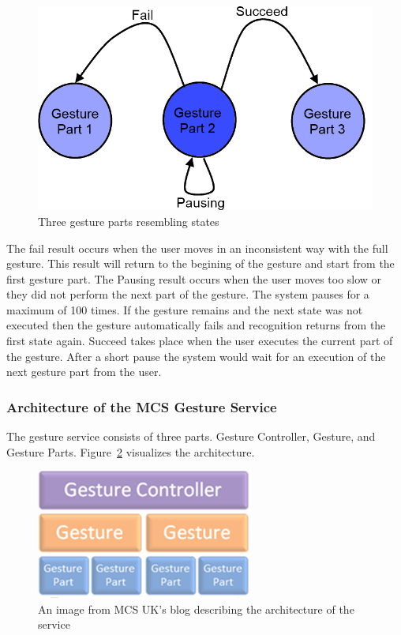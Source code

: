 \begin{figure}[!htbp]
\centering
\includegraphics[width=1\textwidth]{images/gesturestate.png}
\caption{Three gesture parts resembling states}
\label{gesturestates}
\end{figure}

The fail result occurs when the user moves in an inconsistent way with the full gesture. This result will return to the begining of the gesture and start from the first gesture part. The Pausing result occurs when the user moves too slow or they did not perform the next part of the gesture. The system pauses for a maximum of 100 times. If the gesture remains and the next state was not executed then the gesture automatically fails and recognition returns from the first state again. Succeed takes place when the user executes the current part of the gesture. After a short pause the system would wait for an execution of the next gesture part from the user.

\subsubsection{Architecture of the MCS Gesture Service}
The gesture service consists of three parts. Gesture Controller, Gesture, and Gesture Parts. Figure~\ref{gestureservicearc} visualizes the architecture.

\begin{figure}[!htbp]
\centering
\includegraphics{images/mcsarc.png}
\caption{An image from MCS UK's blog describing the architecture of the service}
\label{gestureservicearc}
\end{figure}

